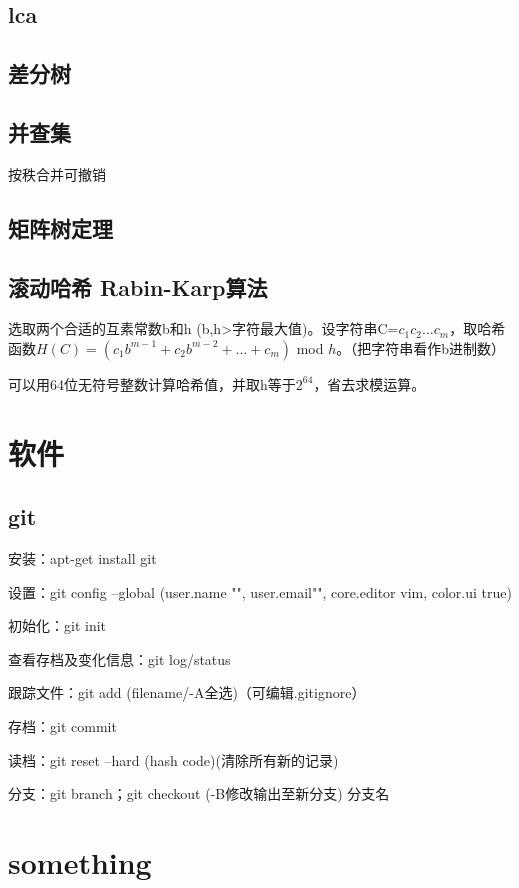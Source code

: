 \documentclass[cn,hazy,blue,screen,14pt]{note}
\begin{document}
\subsection{lca}
\subsection{差分树}

\subsection{并查集}

按秩合并可撤销
\subsection{矩阵树定理}

\subsection{滚动哈希 Rabin-Karp算法}
选取两个合适的互素常数b和h (b,h>字符最大值)。设字符串C=$c_{1}c_{2}...c_{m}$，取哈希函数$H(C)=(c_{1}b^{m-1}+c_{2}b^{m-2}+...+c_{m})$ mod $h$。（把字符串看作b进制数）

可以用64位无符号整数计算哈希值，并取h等于$2^{64}$，省去求模运算。

\newpage
\section{软件}

\subsection{git}

安装：apt-get install git

设置：git config --global (user.name "", user.email"", core.editor vim, color.ui true)

初始化：git init

查看存档及变化信息：git log/status

跟踪文件：git add (filename/-A全选)（可编辑.gitignore）

存档：git commit

读档：git reset --hard (hash code)(清除所有新的记录)

分支：git branch；git checkout (-B修改输出至新分支) 分支名 


\newpage

\section{something}
\end{document}

